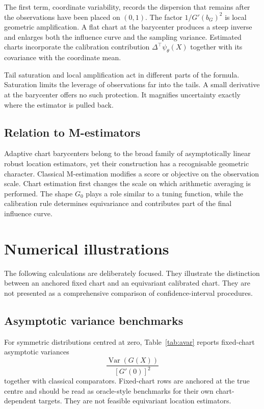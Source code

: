 \documentclass[11pt,a4paper]{article}
\theoremstyle{definition}
\newcommand{\Var}{\operatorname{Var}}
\begin{document}
The first term, coordinate variability, records the dispersion that remains after the observations have been placed on $(0,1)$. The factor $1/G'(b_G)^2$ is local geometric amplification. A flat chart at the barycenter produces a steep inverse and enlarges both the influence curve and the sampling variance. Estimated charts incorporate the calibration contribution $\Delta^\top\psi_\theta(X)$ together with its covariance with the coordinate mean.

Tail saturation and local amplification act in different parts of the formula. Saturation limits the leverage of observations far into the tails. A small derivative at the barycenter offers no such protection. It magnifies uncertainty exactly where the estimator is pulled back.

\subsection{Relation to M-estimators}

Adaptive chart barycenters belong to the broad family of asymptotically linear robust location estimators, yet their construction has a recognisable geometric character. Classical M-estimation modifies a score or objective on the observation scale. Chart estimation first changes the scale on which arithmetic averaging is performed. The shape $G_0$ plays a role similar to a tuning function, while the calibration rule determines equivariance and contributes part of the final influence curve.

\section{Numerical illustrations}\label{sec:numerics}

The following calculations are deliberately focused. They illustrate the distinction between an anchored fixed chart and an equivariant calibrated chart. They are not presented as a comprehensive comparison of confidence-interval procedures.

\subsection{Asymptotic variance benchmarks}

For symmetric distributions centred at zero, Table~\ref{tab:avar} reports fixed-chart asymptotic variances
\[
\frac{\Var(G(X))}{[G'(0)]^2}
\]
together with classical comparators. Fixed-chart rows are anchored at the true centre and should be read as oracle-style benchmarks for their own chart-dependent targets. They are not feasible equivariant location estimators.
\end{document}
